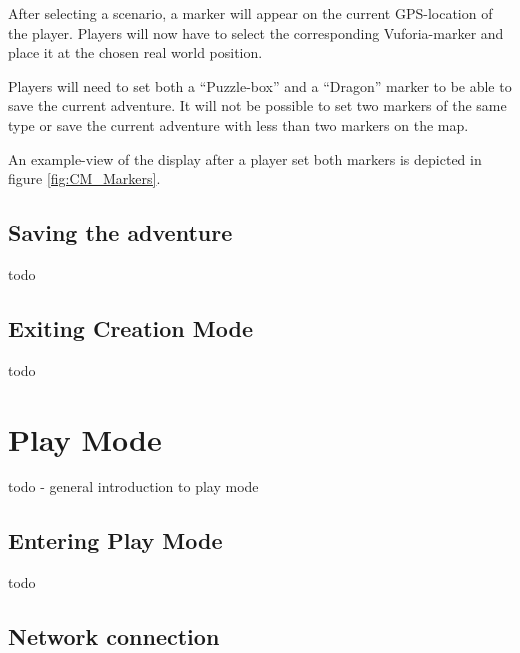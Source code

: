 \documentclass{sigchi-ext}
\begin{document}
After selecting a scenario, a marker will appear on the current GPS-location of the player. Players will now have to select the corresponding Vuforia-marker and place it at the chosen real world position.

Players will need to set both a ``Puzzle-box'' and a ``Dragon'' marker to be able to save the current adventure. It will not be possible to set two markers of the same type or save the current adventure with less than two markers on the map.

An example-view of the display after a player set both markers is depicted in figure \ref{fig:CM_Markers}.

\subsection{Saving the adventure}

todo

\subsection{Exiting Creation Mode}

todo


\section{Play Mode}
\label{sec:PlayMode}

todo - general introduction to play mode

\subsection{Entering Play Mode}

todo


\subsection{Network connection}
\end{document}

